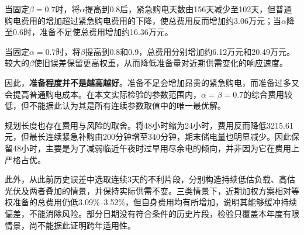 当固定$\beta=0.7$时，将$\alpha$提高到0.8后，紧急购电天数由156天减少至102天，但普通购电费用的增加超过紧急购电费用的下降，使总费用反而增加约3.06万元；当$\alpha$降至0.6时，准备不足使总费用增加约16.36万元。

当固定$\alpha=0.7$时，将$\beta$提高到0.8和0.9，总费用分别增加约6.12万元和20.49万元。较大的$\beta$使旧误差保留更高权重，从而降低准备量对近期供需变化的响应速度。

因此，\textbf{准备程度并不是越高越好}。准备不足会增加昂贵的紧急购电，而准备过多又会提高普通购电成本。在本文实际检验的参数范围内，$\alpha=\beta=0.7$的综合费用较低，但不能据此认为其是所有连续参数取值中的唯一最优解。

规划长度也存在费用与风险的取舍。将48小时缩为24小时，费用反而降低3215.61元，但最长连续紧急补购由200分钟增至340分钟，期末储电量也明显减少。因此保留48小时，主要是为了减弱临近午夜时过早用尽余电的倾向，并非因为它在费用上严格占优。

此外，从此前历史误差中选取连续3天的不利片段，分别构造持续低估负载、高估光伏及两者叠加的情景，并保持实际供需不变。三类情景下，近期加权方案相对等权准备的总费用仍低3.09\%--3.52\%，但自身费用均有所增加，说明其能够缓冲持续偏差，不能消除风险。部分日期没有符合条件的历史片段，检验只覆盖本年度有限情景，尚不能据此证明跨年适用性。
